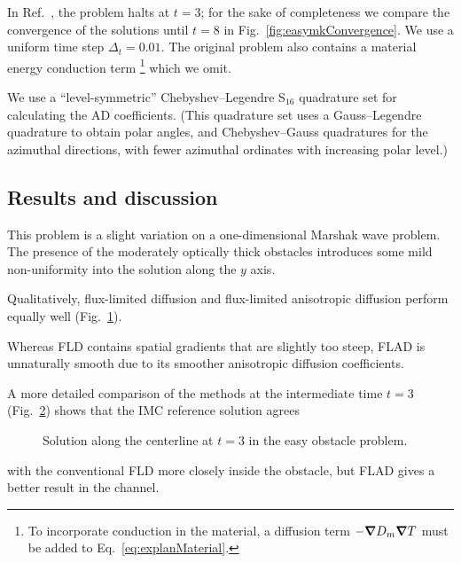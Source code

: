 In Ref.~\cite{Mou2006}, the problem halts at $t=3$; for the sake of completeness we
compare the convergence of the solutions until $t=8$ in
Fig.~\ref{fig:easymkConvergence}. We use a uniform time step $\Delta_t=0.01$.
The original problem also contains a material energy conduction term%
\footnote{To incorporate conduction in the material, a diffusion term
$-\bm{\nabla} D_m \bm{\nabla} T$ must be added to Eq.~\eqref{eq:explanMaterial}.}
which we omit.

We use a ``level-symmetric'' Chebyshev--Legendre S$_{16}$ quadrature set for
calculating the AD coefficients. (This quadrature set uses a Gauss--Legendre
quadrature to obtain polar angles, and Chebyshev--Gauss quadratures for the
azimuthal directions, with fewer azimuthal ordinates with increasing polar
level.)

\subsection{Results and discussion}

This problem is a slight variation on a one-dimensional
Marshak wave problem. The presence of the moderately optically thick obstacles
introduces some mild non-uniformity into the solution along the $y$ axis.

Qualitatively, flux-limited diffusion and flux-limited anisotropic diffusion
perform equally well (Fig.~\ref{fig:easymkContour}).
%
\begin{figure}[htb]
  \centering
  \label{fig:easymkContour}
\end{figure}
%
Whereas FLD contains spatial gradients that are slightly
too steep, FLAD is unnaturally smooth due to its smoother anisotropic diffusion
coefficients.

A more detailed comparison of the methods at the intermediate time $t=3$
(Fig.~\ref{fig:easymkCenterline}) shows that the IMC reference solution agrees
%
\begin{figure}[htb]
  \centering
  \caption{Solution along the centerline at $t=3$ in the easy obstacle
  problem.}
  \label{fig:easymkCenterline}
\end{figure}
%
with the conventional FLD more closely inside the obstacle, but FLAD gives a
better result in the channel.

